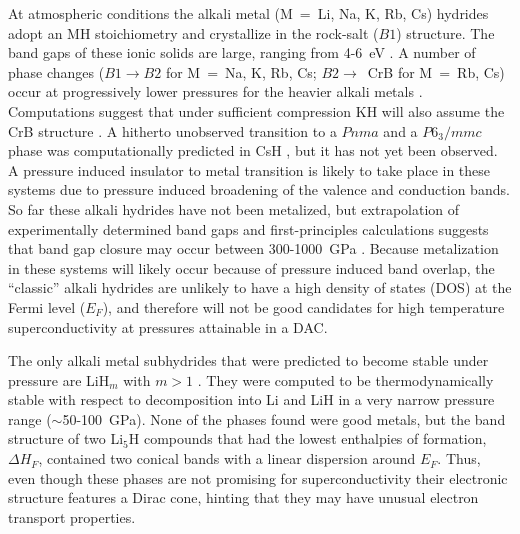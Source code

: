 \documentclass[12pt,letterpaper,oneside]{article}
\begin{document}

At atmospheric conditions the alkali metal (M~=~Li, Na, K, Rb, Cs) hydrides adopt an MH stoichiometry and crystallize in the rock-salt ($B1$) structure. The band gaps of these ionic solids are large, ranging from 4-6~eV \cite{Setten:2007a,Lebegue:2003b}. A number of phase changes ($B1 \rightarrow B2$ for M~=~Na, K, Rb, Cs; $B2 \rightarrow$~CrB for M~=~Rb, Cs) occur at progressively lower pressures for the heavier alkali metals \cite{Duclos:1987a,Hochheimer:1985a,Ghandehari:1995a,Ghandehari:1995b}. Computations suggest that under sufficient compression KH will also assume the CrB structure \cite{Ahuja:1998a, Ahuja:1999a}. A hitherto unobserved transition to a $Pnma$ and a $P6_3/mmc$ phase was computationally predicted in CsH \cite{Hooper:2011}, but it has not yet been observed. A pressure induced insulator to metal transition is likely to take place in these systems due to pressure induced broadening of the valence and conduction bands. So far these alkali hydrides have not been metalized, but extrapolation of experimentally determined band gaps and first-principles calculations suggests that band gap closure may occur between 300-1000~GPa  \cite{Lebegue:2003a,Ghandehari:1995c,Ghandehari:1995b}. Because metalization in these systems will likely occur because of pressure induced band overlap, the ``classic'' alkali hydrides are unlikely to have a high density of states (DOS) at the Fermi level ($E_F$), and therefore will not be good candidates for high temperature superconductivity at pressures attainable in a DAC. 


The only alkali metal subhydrides that were predicted to become stable under pressure are LiH$_m$ with $m>1$ \cite{Hooper:2012}. They were computed to be thermodynamically stable with respect to decomposition into Li and LiH in a very narrow pressure range ($\sim$50-100~GPa). None of the phases found were good metals, but the band structure of two Li$_5$H compounds that had the lowest enthalpies of formation, $\Delta H_F$, contained two conical bands with a linear dispersion around $E_F$. Thus, even though these phases are not promising for superconductivity their electronic structure features a Dirac cone, hinting that they may have unusual electron transport properties.
\end{document}
